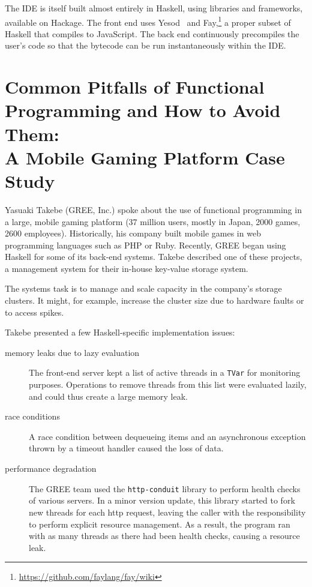 \documentclass{jfp1}
\begin{document}
The IDE is itself built almost entirely in Haskell, using libraries and
frameworks, available on Hackage.  The front end uses
Yesod~\cite{Snoyman:2012:Developing} and
Fay,\footnote{\url{https://github.com/faylang/fay/wiki}} a proper subset
of Haskell that compiles to JavaScript. The back end continuously
precompiles the user's code so that the bytecode can be run
instantaneously within the IDE.

\section{Common Pitfalls of Functional Programming and How 
to Avoid Them:\\ A Mobile Gaming Platform Case Study}


Yasuaki Takebe (GREE, Inc.) spoke about the use of functional programming
in a large, mobile gaming platform (37 million users, mostly in Japan,
2000 games, 2600 employees).  Historically, his company built mobile games
in web programming languages such as PHP or Ruby. Recently, GREE began
using Haskell for some of its back-end systems. Takebe described one of
these projects, a management system for their in-house key-value storage
system.

The systems task is to manage and scale capacity in the company's storage
clusters. It might, for example, increase the cluster size due to hardware
faults or to access spikes.

Takebe presented a few Haskell-specific implementation issues:

\begin{description}

\item[memory leaks due to lazy evaluation] The front-end server kept a
list of active threads in a \texttt{TVar} for monitoring purposes. Operations
to remove threads from this list were evaluated lazily, and could thus
create a large memory leak.

\item[race conditions] A race condition between dequeueing items and an
asynchronous exception thrown by a timeout handler caused the loss of data.

\item[performance degradation] The GREE team used the \texttt{http-conduit}
library to perform health checks of various servers. In a minor version
update, this library started to fork new threads for each http request,
leaving the caller with the responsibility to perform explicit resource
management. As a result, the program ran with as many threads as there had
been health checks, causing a resource leak. 
\end{description}
\end{document}
